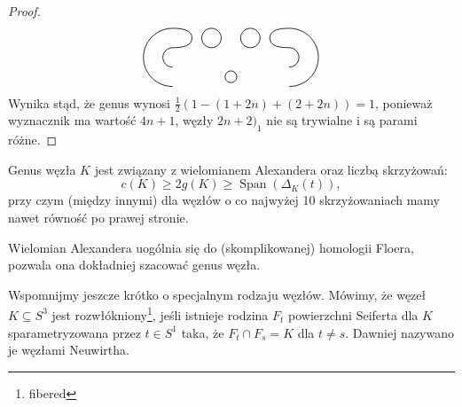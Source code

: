 \begin{proof}
\[\begin{tikzpicture}[baseline=-0.65ex,scale=0.055]
            \draw[semithick] (0,-10) circle (3);

            \draw[semithick] (-30, 15) to [out=left, in=up]   (-45, 0);
            \draw[semithick] (-30,-15) to [out=left, in=down] (-45, 0);
            \draw[semithick] (-30,  5) to [out=left, in=up]   (-35, 0);
            \draw[semithick] (-30, -5) to [out=left, in=down] (-35, 0);

            \draw[semithick] (30, 15) to [out=right, in=up]   (45,0);
            \draw[semithick] (30,-15) to [out=right, in=down] (45,0);
            \draw[semithick] (30,  5) to [out=right, in=up]   (35,0);
            \draw[semithick] (30, -5) to [out=right, in=down] (35,0);

            \draw[semithick] (-30, 15) to [out=right, in=up] (-20,10);
            \draw[semithick] (-30,  5) to [out=right, in=down] (-20,10);

            \draw[semithick] (30, 15) to [out=left, in=up] (20,10);
            \draw[semithick] (30,  5) to [out=left, in=down] (20,10);

            \draw[semithick] (-10, 10) circle (5);
            \draw[semithick] (10,  10) circle (5);
        \end{tikzpicture}
    \]
    Wynika stąd, że genus wynosi $\frac 12 (1 - (1+2n) + (2+2n)) = 1$, ponieważ wyznacznik ma wartość $4n+1$,
    węzły $2n+2)_1$ nie są trywialne i są parami różne.
\end{proof}

\begin{proposition}
    Genus węzła $K$ jest związany z wielomianem Alexandera oraz liczbą skrzyżowań:
    \[
        c(K) \ge 2 g(K) \ge \operatorname{Span}(\Delta_K(t)),
    \]
    przy czym (między innymi) dla węzłów o co najwyżej 10 skrzyżowaniach mamy nawet równość po prawej stronie.
\end{proposition}

Wielomian Alexandera uogólnia się do (skomplikowanej) homologii Floera, pozwala ona dokładniej szacować genus węzła.

Wspomnijmy jeszcze krótko o specjalnym rodzaju węzłów.
Mówimy, że węzeł $K \subseteq S^3$ jest rozwłókniony\footnote{fibered}, jeśli istnieje rodzina $F_t$ powierzchni Seiferta dla $K$ sparametryzowana przez $t \in S^1$ taka, że $F_t \cap F_s = K$ dla $t \neq s$.
Dawniej nazywano je węzłami Neuwirtha.

